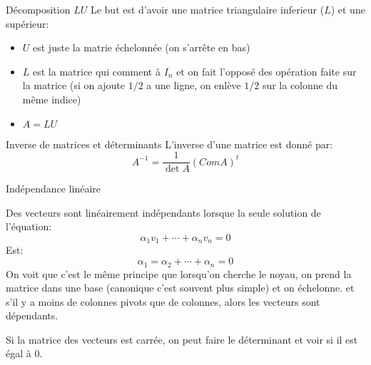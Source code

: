 \begin{parag}{Décomposition $LU$}
    Le but est d'avoir une matrice triangulaire inferieur ($L$) et une supérieur:
    \begin{itemize}
        \item $U$ est juste la matrie échelonnée (on s'arrête en bas)
        \item $L$ est la matrice qui comment à $I_n$ et on fait l'opposé des opération faite sur la matrice (si on ajoute $1/2$ a une ligne, on enlève $1/2$ sur la colonne du même indice)
        \item $A = LU$
    \end{itemize}
\end{parag}
\begin{parag}{Inverse de matrices et déterminants}
    L'inverse d'une matrice est donné par:
    \[A^{-1} = \frac{1}{\det A}(Com A)^t\]
    
\end{parag}


\begin{parag}{Indépendance linéaire}
    \begin{truc}
        Des vecteurs sont linéairement indépendants lorsque la seule solution de l'équation:
        \[\alpha_1v_1 + \cdots + \alpha_n v_n = 0\]
        Est:
        \[\alpha_1 = \alpha_2 + \cdots + \alpha_n = 0\]
        On voit que c'est le même principe que lorsqu’on cherche le noyau, on prend la matrice dans une base (canonique c'est souvent plus simple) et on échelonne. et s'il y a moins de colonnes pivots que de colonnes, alors les vecteurs sont dépendants.
        
    \end{truc}
    \begin{truc}
        Si la matrice des vecteurs est carrée, on peut faire le déterminant et voir si il est égal à 0.
    \end{truc}
    
    
\end{parag}


